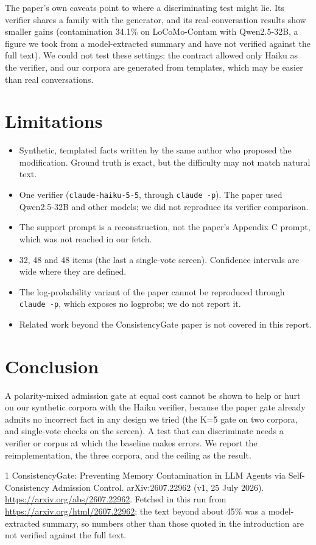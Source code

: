 \documentclass[11pt]{article}
\begin{document}
The paper's own caveats point to where a discriminating test might lie. Its verifier shares a family with the generator, and its real-conversation results show smaller gains (contamination 34.1\% on LoCoMo-Contam with Qwen2.5-32B, a figure we took from a model-extracted summary and have not verified against the full text). We could not test these settings: the contract allowed only Haiku as the verifier, and our corpora are generated from templates, which may be easier than real conversations.

\section{Limitations}
\begin{itemize}
\item Synthetic, templated facts written by the same author who proposed the modification. Ground truth is exact, but the difficulty may not match natural text.
\item One verifier (\texttt{claude-haiku-5-5}, through \texttt{claude -p}). The paper used Qwen2.5-32B and other models; we did not reproduce its verifier comparison.
\item The support prompt is a reconstruction, not the paper's Appendix C prompt, which was not reached in our fetch.
\item 32, 48 and 48 items (the last a single-vote screen). Confidence intervals are wide where they are defined.
\item The log-probability variant of the paper cannot be reproduced through \texttt{claude -p}, which exposes no logprobs; we do not report it.
\item Related work beyond the ConsistencyGate paper is not covered in this report.
\end{itemize}

\section{Conclusion}
A polarity-mixed admission gate at equal cost cannot be shown to help or hurt on our synthetic corpora with the Haiku verifier, because the paper gate already admits no incorrect fact in any design we tried (the K=5 gate on two corpora, and single-vote checks on the screen). A test that can discriminate needs a verifier or corpus at which the baseline makes errors. We report the reimplementation, the three corpora, and the ceiling as the result.


\begin{thebibliography}{1}
 ConsistencyGate: Preventing Memory Contamination in LLM Agents via Self-Consistency Admission Control. arXiv:2607.22962 (v1, 25 July 2026). \url{https://arxiv.org/abs/2607.22962}. Fetched in this run from \url{https://arxiv.org/html/2607.22962}; the text beyond about 45\% was a model-extracted summary, so numbers other than those quoted in the introduction are not verified against the full text.
\end{thebibliography}
\end{document}
